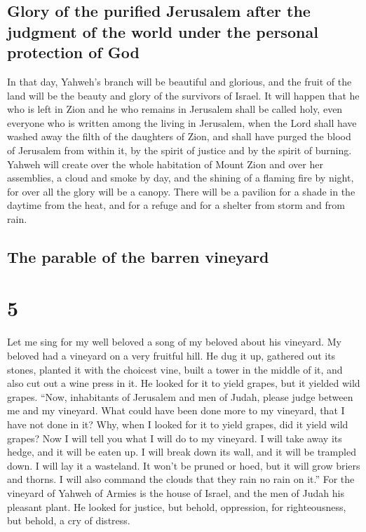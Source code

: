 \hypertarget{glory-of-the-purified-jerusalem-after-the-judgment-of-the-world-under-the-personal-protection-of-god}{%
\subsection{Glory of the purified Jerusalem after the judgment of the
world under the personal protection of
God}\label{glory-of-the-purified-jerusalem-after-the-judgment-of-the-world-under-the-personal-protection-of-god}}

 In that day, Yahweh's branch will be beautiful and
glorious, and the fruit of the land will be the beauty and glory of the
survivors of Israel.  It will happen that he who is left
in Zion and he who remains in Jerusalem shall be called holy, even
everyone who is written among the living in Jerusalem, 
when the Lord shall have washed away the filth of the daughters of Zion,
and shall have purged the blood of Jerusalem from within it, by the
spirit of justice and by the spirit of burning.  Yahweh
will create over the whole habitation of Mount Zion and over her
assemblies, a cloud and smoke by day, and the shining of a flaming fire
by night, for over all the glory will be a canopy.  There
will be a pavilion for a shade in the daytime from the heat, and for a
refuge and for a shelter from storm and from rain.

\hypertarget{the-parable-of-the-barren-vineyard}{%
\subsection{The parable of the barren
vineyard}\label{the-parable-of-the-barren-vineyard}}

\hypertarget{section-4}{%
\section{5}\label{section-4}}

 Let me sing for my well beloved a song of my beloved
about his vineyard. My beloved had a vineyard on a very fruitful hill.
 He dug it up, gathered out its stones, planted it with
the choicest vine, built a tower in the middle of it, and also cut out a
wine press in it. He looked for it to yield grapes, but it yielded wild
grapes.  ``Now, inhabitants of Jerusalem and men of Judah,
please judge between me and my vineyard.  What could have
been done more to my vineyard, that I have not done in it? Why, when I
looked for it to yield grapes, did it yield wild grapes? 
Now I will tell you what I will do to my vineyard. I will take away its
hedge, and it will be eaten up. I will break down its wall, and it will
be trampled down.  I will lay it a wasteland. It won't be
pruned or hoed, but it will grow briers and thorns. I will also command
the clouds that they rain no rain on it.''  For the
vineyard of Yahweh of Armies is the house of Israel, and the men of
Judah his pleasant plant. He looked for justice, but behold, oppression,
for righteousness, but behold, a cry of distress.

